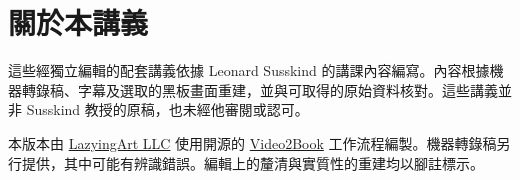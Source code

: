 \documentclass[11pt,oneside]{book}
\begin{document}
\frontmatter
\hypersetup{pageanchor=false}

\hypersetup{pageanchor=true}

\clearpage
\chapter*{關於本講義}
這些經獨立編輯的配套講義依據 Leonard Susskind 的講課內容編寫。內容根據機器轉錄稿、字幕及選取的黑板畫面重建，並與可取得的原始資料核對。這些講義並非 Susskind 教授的原稿，也未經他審閱或認可。

本版本由 \href{https://lazying.art}{LazyingArt LLC} 使用開源的 \href{https://github.com/lachlanchen/Video2Book}{Video2Book} 工作流程編製。機器轉錄稿另行提供，其中可能有辨識錯誤。編輯上的釐清與實質性的重建均以腳註標示。
\clearpage
\tableofcontents
\mainmatter








\end{document}
